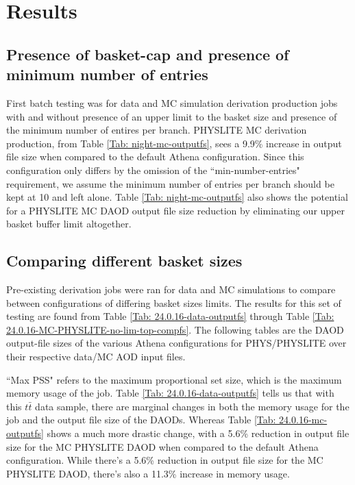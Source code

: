 
\section{Results}
\label{sec:DAODProd_Results}

\subsection{Presence of basket-cap and presence of minimum number of entries}
\label{sec:DAODProd_Results_presence}

First batch testing was for data and MC simulation derivation production jobs with and without presence of an upper limit to the basket size and presence of the minimum number of entires per branch. 
PHYSLITE MC derivation production, from Table \ref{Tab: night-mc-outputfs}, sees a 9.9\% increase in output file size when compared to the default Athena configuration. 
Since this configuration only differs by the omission of the ``min-number-entries" requirement, we assume the minimum number of entries per branch should be kept at 10 and left alone. 
Table \ref{Tab: night-mc-outputfs} also shows the potential for a PHYSLITE MC DAOD output file size reduction by eliminating our upper basket buffer limit altogether.  



\subsection{Comparing different basket sizes}
\label{sec:DAODProd_Results_comparing}

Pre-existing derivation jobs were ran for data and MC simulations to compare between configurations of differing basket sizes limits. 
The results for this set of testing are found from Table \ref{Tab: 24.0.16-data-outputfs} through Table \ref{Tab: 24.0.16-MC-PHYSLITE-no-lim-top-compfs}. 
The following tables are the DAOD output-file sizes of the various Athena configurations for PHYS/PHYSLITE over their respective data/MC AOD input files. 





``Max PSS" refers to the maximum proportional set size, which is the maximum memory usage of the job.
Table \ref{Tab: 24.0.16-data-outputfs} tells us that with this $t\bar{t}$ data sample, there are marginal changes in both the memory usage for the job and the output file size of the DAODs. 
Whereas Table \ref{Tab: 24.0.16-mc-outputfs} shows a much more drastic change, with a 5.6\% reduction in output file size for the MC PHYSLITE DAOD when compared to the default Athena configuration.
While there's a 5.6\% reduction in output file size for the MC PHYSLITE DAOD, there's also a 11.3\% increase in memory usage. 


